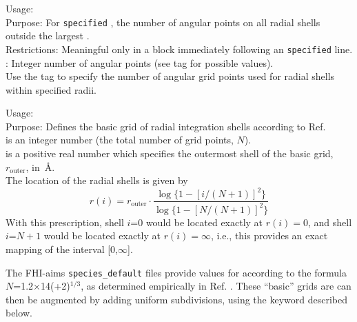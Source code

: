 {
  \noindent
  Usage:  
     \\[1.0ex]
  Purpose: For \texttt{specified}
    , the number of angular points 
    on all radial shells outside the largest
    . \\[1.0ex] 
    Restrictions: Meaningful only in a block immediately following an
     \texttt{specified}
    line. \\[1.0ex]
   : Integer number of angular points (see
     tag for possible values). \\ 
}
Use the  tag to specify the number of 
angular grid points used for radial shells within specified radii.

{
  \noindent
  Usage:  
     \\[1.0ex]
  Purpose: Defines the basic grid of radial integration shells
    according to Ref. \cite{Baker94} \\[1.0ex]
   is an integer number (the total number of grid points,
    $N$). \\
   is a positive real number which specifies the outermost
    shell of the basic grid, $r_\text{outer}$, in~\AA. \\
}
The location of the  radial shells is given by
\begin{equation}
  r(i) = r_\text{outer} \cdot \frac{\log\{1-[i/(N+1)]^2\}}{\log\{1-[N/(N+1)]^2\}}
\end{equation}
With this prescription, shell $i$=0 would be located exactly at
$r(i)=0$, and shell $i$=$N+1$ would be located exactly at
$r(i)=\infty$, i.e., this provides an exact mapping of the interval
[0,$\infty$]. 

The FHI-aims \texttt{species\_default} files provide values for
 according to the formula
$N$=1.2$\times$14(+2)$^{1/3}$, as
determined empirically in Ref. \cite{Baker94}. These ``basic'' grids are
can then be augmented by adding uniform subdivisions, using the
 keyword described below. 


